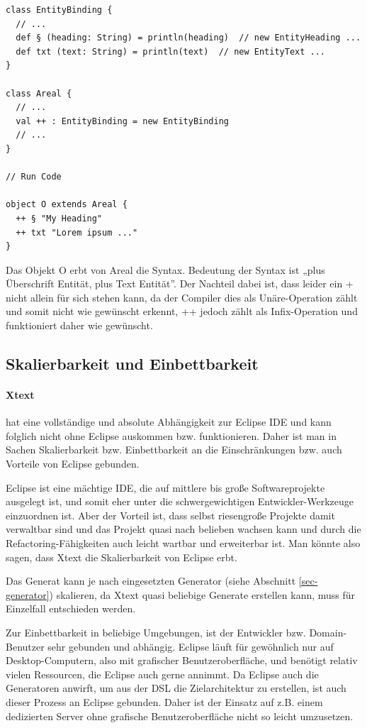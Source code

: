 \begin{lstlisting}[caption=Scala DSL Syntax (Snippet).]
class EntityBinding {
  // ...
  def § (heading: String) = println(heading)  // new EntityHeading ...
  def txt (text: String) = println(text)  // new EntityText ...
}

class Areal {
  // ...
  val ++ : EntityBinding = new EntityBinding
  // ...
}

// Run Code

object O extends Areal {
  ++ § "My Heading"
  ++ txt "Lorem ipsum ..."
}
\end{lstlisting}

Das Objekt O erbt von Areal die Syntax. Bedeutung der Syntax ist
„plus Überschrift Entität, plus Text Entität”. Der Nachteil dabei ist,
dass leider ein + nicht allein für sich stehen kann, da der Compiler dies
als Unäre-Operation zählt und somit nicht wie gewünscht erkennt, ++ jedoch
zählt als Infix-Operation und funktioniert daher wie gewünscht.

\subsection{Skalierbarkeit und Einbettbarkeit}\label{sec-scalierEinbett}

\paragraph{Xtext} hat eine vollständige und absolute Abhängigkeit
zur Eclipse IDE und kann folglich nicht ohne Eclipse auskommen bzw.
funktionieren. Daher ist man in Sachen Skalierbarkeit bzw. Einbettbarkeit
an die Einschränkungen bzw. auch Vorteile von Eclipse gebunden.

Eclipse ist eine mächtige IDE, die auf mittlere bis große Softwareprojekte
ausgelegt ist, und somit eher unter die schwergewichtigen Entwickler-Werkzeuge
einzuordnen ist. Aber der Vorteil ist, dass selbst riesengroße Projekte
damit verwaltbar sind und das Projekt quasi nach belieben wachsen kann und
durch die Refactoring-Fähigkeiten auch leicht wartbar und erweiterbar ist.
Man könnte also sagen, dass Xtext die Skalierbarkeit von Eclipse erbt.

Das Generat kann je nach eingesetzten Generator (siehe Abschnitt
\ref{sec-generator}) skalieren, da Xtext quasi beliebige Generate erstellen
kann, muss für Einzelfall entschieden werden.

Zur Einbettbarkeit in beliebige Umgebungen, ist der Entwickler bzw.
Domain-Benutzer sehr gebunden und abhängig. Eclipse läuft für gewöhnlich
nur auf Desktop-Computern, also mit grafischer Benutzeroberfläche,
und benötigt relativ vielen Ressourcen, die Eclipse auch
gerne annimmt.
Da Eclipse auch die Generatoren anwirft, um aus der DSL
die Zielarchitektur zu erstellen, ist auch dieser Prozess an Eclipse gebunden.
Daher ist der Einsatz auf z.B. einem dedizierten Server ohne grafische
Benutzeroberfläche nicht so leicht umzusetzen.

